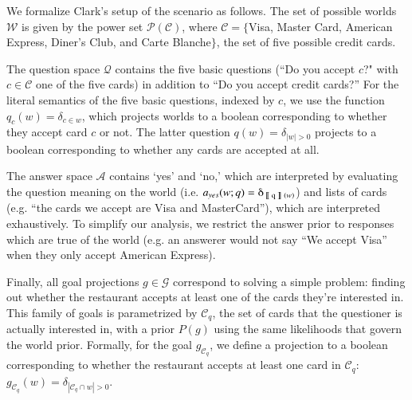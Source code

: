 \documentclass[12pt, floatsintext, jou]{apa6}
\newcommand{\den}[2][]{
\(
\left\llbracket\;\text{#2}\;\right\rrbracket^{#1}
\)
}
\begin{document}
We formalize Clark's setup of the scenario as follows. The set of possible worlds $\mathcal{W}$ is given by the power set $\mathcal{P}(\mathcal{C})$, where $\mathcal{C} = \{$Visa, Master Card, American Express, Diner's Club, and Carte Blanche$\}$, the set of five possible credit cards. %

The question space $\mathcal{Q}$ contains the five basic questions (``Do you accept $c$?" with $c \in \mathcal{C}$ one of the five cards) in addition to ``Do you accept credit cards?'' For the literal semantics of the five basic questions, indexed by $c$, we use the function $q_c(w) = \delta_{c \in w}$, which projects worlds to a boolean corresponding to whether they accept card $c$ or not.
The latter question $q(w)  = \delta_{|w| > 0}$ projects to a boolean corresponding to whether any cards are accepted at all. %

The answer space $\mathcal{A}$ contains `yes' and `no,' which are interpreted by evaluating the question meaning on the world (i.e. $a_{yes}(w;q) = \delta_{\textrm{\den{q}}(w)}$) and lists of cards (e.g. ``the cards we accept are Visa and MasterCard''), which are interpreted exhaustively. 
To simplify our analysis, we restrict the answer prior to responses which are true of the world (e.g. an answerer would not say ``We accept Visa'' when they only accept American Express).

Finally, all goal projections $g \in \mathcal{G}$ correspond to solving a simple problem: finding out whether the restaurant accepts at least one of the cards they're interested in. This family of goals is parametrized by $\mathcal{C}_q$, the set of cards that the questioner is actually interested in, with a prior $P(g)$ using the same likelihoods that govern the world prior.
Formally, for the goal $g_{\mathcal{C}_q}$, we define a projection to a boolean corresponding to whether the restaurant accepts at least one card in $\mathcal{C}_q$:
$g_{\mathcal{C}_q}(w) = \delta_{|\mathcal{C}_q \cap w | > 0}$.
\end{document}
